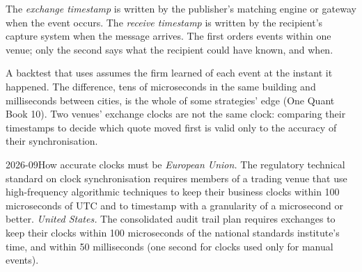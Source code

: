 \begin{definition}\label{def:m1:reading-market-data:ts}
The \emph{exchange timestamp} is written by the
publisher's matching engine or gateway when the event occurs. The
\emph{receive timestamp} is written by the
recipient's capture system when the message arrives. The first orders events
within one venue; only the second says what the recipient could have known,
and when.
\end{definition}

A backtest that uses  assumes the firm learned of each
event at the instant it happened. The difference, tens of microseconds in
the same building and milliseconds between cities, is the whole of some
strategies' edge (One Quant Book 10). Two venues' exchange clocks are not
the same clock: comparing their timestamps to decide which quote moved
first is valid only to the accuracy of their synchronisation.

\begin{dated}{2026-09}{How accurate clocks must be}\label{dat:m1:reading-market-data:clocks}
\emph{European Union.} The regulatory technical standard on clock
synchronisation requires members of a trading venue that use high-frequency
algorithmic techniques to keep their business clocks within 100
microseconds of UTC and to timestamp with a granularity of a microsecond or
better. \emph{United States.} The consolidated audit trail plan requires
exchanges to keep their clocks within 100 microseconds of the national
standards institute's time, and  within 50 milliseconds (one
second for clocks used only for manual events).
\end{dated}

\begin{omfigure}

\label{fig:m1:reading-market-data:reorder}
\end{omfigure}

